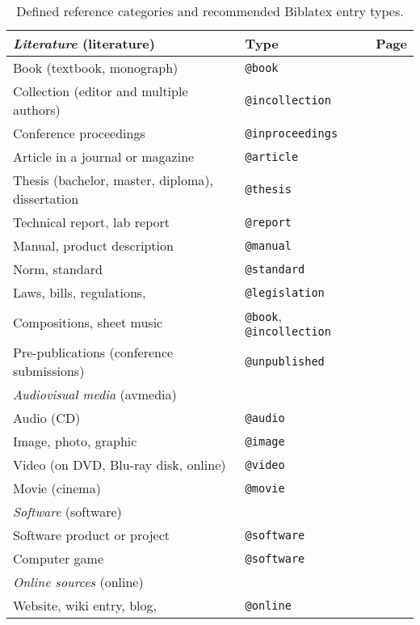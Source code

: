 \begin{table}[htbp]
\caption{Defined reference categories and recommended Biblatex entry types.}
\label{tab:references-and-entry-types}
\centering
\begin{tabular}{@{}llc@{}}
	\toprule
	\emph{Literature} (\textsf{literature}) & Type & Page\\
	\midrule
	Book (textbook, monograph) & \texttt{@book} & \pageref{sec:@book}\\
	Collection (editor and multiple authors) & \texttt{@incollection} & \pageref{sec:@incollection} \\
	Conference proceedings & \texttt{@inproceedings} & \pageref{sec:@inproceedings}\\
	Article in a journal or magazine & \texttt{@article} & \pageref{sec:@article}\\
	Thesis (bachelor, master, diploma), dissertation & \texttt{@thesis} & \pageref{sec:@thesis}\\
	Technical report, lab report & \texttt{@report} & \pageref{sec:@report}\\
	Manual, product description & \texttt{@manual} & \pageref{sec:@manual}\\
	Norm, standard & \texttt{@standard} & \pageref{sec:@standard}\\
	Laws, bills, regulations, \etc & \texttt{@legislation} & \pageref{sec:@legislation}\\
	Compositions, sheet music & \texttt{@book}, \texttt{@incollection} & \pageref{sec:sheet-music}\\
	Pre-publications (\eg conference submissions) & \texttt{@unpublished} & \pageref{sec:@unpublished}\\
	\addlinespace
%
	\midrule
	\emph{Audiovisual media} (\textsf{avmedia}) & & \\
	\midrule
	Audio (CD) & \texttt{@audio} & \pageref{sec:@audio}\\
	Image, photo, graphic & \texttt{@image} & \pageref{sec:@image}\\
	Video (on DVD, Blu-ray disk, online) & \texttt{@video} & \pageref{sec:@video}\\
	Movie (cinema) & \texttt{@movie} & \pageref{sec:@movie}\\
	\addlinespace
%
	\midrule
	\emph{Software} (\textsf{software}) & & \\
	\midrule
	Software product or project & \texttt{@software} & \pageref{sec:@software}\\
	Computer game & \texttt{@software} & \pageref{sec:@software}\\
	\addlinespace
%
	\midrule
	\emph{Online sources} (\textsf{online}) & & \\
	\midrule
	Website, wiki entry, blog, \etc & \texttt{@online} & \pageref{sec:@online-www} \\
	\bottomrule
\end{tabular}
\end{table}

